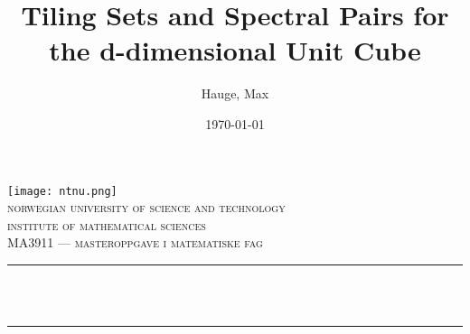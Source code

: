 
\begin{titlepage}
	\title{\textsf{Tiling Sets and Spectral Pairs for the d-dimensional Unit Cube}}  %
	\author{Hauge, Max}
	\date{\today}

	\makeatletter
	\let\thetitle\@title
	\let\theauthor\@author
	\let\thedate\@date
	\makeatother


	\centering
    \vspace*{0.5 cm}
    \texttt{[image: ntnu.png]}\\[1.0 cm]
    
	\textsc{\LARGE \textsf{norwegian university of science and technology}}\\[1.0 cm]  %
    
	\textsc{\Large \textsf{institute of mathematical sciences}}\\[0.5 cm]  %
	
	\textsc{\large \textsf{MA3911 — masteroppgave i matematiske fag}}\\[0.5 cm]  %
	
	\rule{\linewidth}{0.2 mm} \\[0.4 cm]
	{ \LARGE \textbf{\uppercase{\thetitle}}}\\
	\rule{\linewidth}{0.2 mm} \\[1.5 cm]
	

\end{titlepage}
